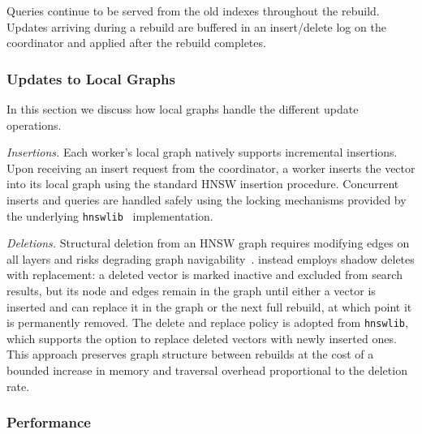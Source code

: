 \documentclass[sigconf,review,anonymous]{acmart}
\begin{document}
    Queries continue to be served from the old indexes throughout the rebuild. Updates arriving during a rebuild are buffered in an insert/delete log on the coordinator and applied after the rebuild completes.



\subsubsection{Updates to Local Graphs}
    In this section we discuss how local graphs handle the different update operations.

    \textit{Insertions.} Each worker's local graph natively supports incremental insertions. Upon receiving an insert request from the coordinator, a worker inserts the vector into its local graph using the standard HNSW insertion procedure. Concurrent inserts and queries are handled safely using the locking mechanisms provided by the underlying \texttt{hnswlib}~\cite{malkov2018efficient} implementation.

    \textit{Deletions.} Structural deletion from an HNSW graph requires modifying edges on all layers and risks degrading graph navigability~\cite{yu2025topology, xiao2024enhancing, xu2025place}. \SystemName{} instead employs shadow deletes with replacement: a deleted vector is marked inactive and excluded from search results, but its node and edges remain in the graph until either a vector is inserted and can replace it in the graph or the next full rebuild, at which point it is permanently removed. The delete and replace policy is adopted from \texttt{hnswlib}, which supports the option to replace deleted vectors with newly inserted ones. This approach preserves graph structure between rebuilds at the cost of a bounded increase in memory and traversal overhead proportional to the deletion rate.

\subsubsection{Performance}
\end{document}
